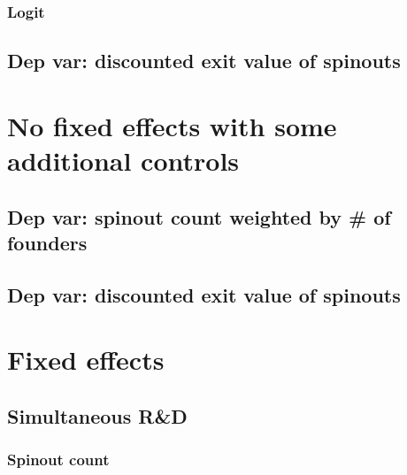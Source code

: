 \documentclass[12pt,english]{article}
\theoremstyle{remark}
\begin{document}
\subsubsection{Logit}

\linebreak

\linebreak


\subsection{Dep var: discounted exit value of spinouts}

 

\section{No fixed effects with some additional controls}

\subsection{Dep var: spinout count weighted by \# of founders}



\subsection{Dep var: discounted exit value of spinouts}



\section{Fixed effects}

\subsection{Simultaneous R\&D}

\subsubsection{Spinout count}


\linebreak

\linebreak

\end{document}

